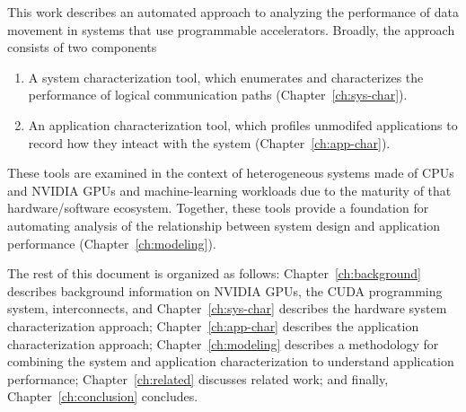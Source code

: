 This work describes an automated approach to analyzing the performance of data movement in systems that use programmable accelerators.
Broadly, the approach consists of two components
\begin{enumerate}
    \item A system characterization tool, which enumerates and characterizes the performance of logical communication paths (Chapter~\ref{ch:sys-char}).
    \item An application characterization tool, which profiles unmodifed applications to record how they inteact with the system (Chapter~\ref{ch:app-char}).
\end{enumerate}
These tools are examined in the context of heterogeneous systems made of CPUs and NVIDIA GPUs and machine-learning workloads due to the maturity of that hardware/software ecosystem.
Together, these tools provide a foundation for automating analysis of the relationship between system design and application performance (Chapter~\ref{ch:modeling}).

The rest of this document is organized as follows:
Chapter~\ref{ch:background} describes background information on NVIDIA GPUs, the CUDA programming system, interconnects, and 
Chapter~\ref{ch:sys-char} describes the hardware system characterization approach;
Chapter~\ref{ch:app-char} describes the application characterization approach;
Chapter~\ref{ch:modeling} describes a methodology for combining the system and application characterization to understand application performance;
Chapter~\ref{ch:related} discusses related work;
and finally, Chapter~\ref{ch:conclusion} concludes.